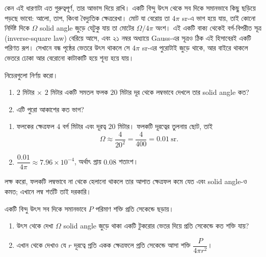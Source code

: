 \documentclass[11pt]{article}
\begin{document}
\begin{remark}
কেন এই ধারণাটা এত গুরুত্বপূর্ণ, তার আভাস দিয়ে রাখি। একটি বিন্দু উৎস থেকে সব
দিকে সমানভাবে কিছু ছড়িয়ে পড়ছে ভাবো: আলো, তাপ, কিংবা বৈদ্যুতিক ক্ষেত্ররেখা।
মোট যা বেরোয় তা $4\pi$ sr-এ ভাগ হয়ে যায়, তাই কোনো নির্দিষ্ট দিকে $\Omega$
solid angle জুড়ে যেটুকু যায় তা মোটের $\Omega/4\pi$ অংশ। এই একটি বাক্য থেকেই
বর্গ-বিপরীত সূত্র (inverse-square law) বেরিয়ে আসে, এবং ২১ নম্বর অধ্যায়ে
Gauss-এর সূত্রও ঠিক এই হিসাবেরই একটি পরিণত রূপ। সেখানে বন্ধ পৃষ্ঠের ভেতরে উৎস
থাকলে সে $4\pi$ sr-এর পুরোটাই জুড়ে থাকে, আর বাইরে থাকলে ভেতরে ঢোকা আর বেরোনো
কাটাকাটি হয়ে শূন্য হয়ে যায়।
\end{remark}

 নিচেরগুলো নির্ণয় করো।
\begin{enumerate}
  \item $2$ মিটার $\times$ $2$ মিটার একটি সমতল ফলক $20$ মিটার দূর থেকে লম্বভাবে
        দেখলে তার solid angle কত?
  \item এটি পুরো আকাশের কত ভাগ?
\end{enumerate}

\begin{sol}
\begin{enumerate}
  \item ফলকের ক্ষেত্রফল $4$ বর্গ মিটার এবং দূরত্ব $20$ মিটার। ফলকটি দূরত্বের
        তুলনায় ছোট, তাই
        \[
          \Omega \approx \frac{4}{20^{2}} = \frac{4}{400} = 0.01 \ \mathrm{sr}.
        \]
  \item $\dfrac{0.01}{4\pi} \approx 7.96 \times 10^{-4}$, অর্থাৎ প্রায়
        $0.08$ শতাংশ।
\end{enumerate}
লক্ষ করো, ফলকটি লম্বভাবে না থেকে হেলানো থাকলে তার আপাত ক্ষেত্রফল কমে যেত এবং
solid angle-ও কমত; এখানে লম্ব শর্তটি তাই দরকারি।
\end{sol}

 একটি বিন্দু উৎস সব দিকে সমানভাবে $P$ পরিমাণ শক্তি প্রতি সেকেন্ডে ছড়ায়।
\begin{enumerate}
  \item উৎস থেকে দেখা $\Omega$ solid angle জুড়ে থাকা একটি টুকরোর ভেতর দিয়ে
        প্রতি সেকেন্ডে কত শক্তি যায়?
  \item এখান থেকে দেখাও যে $r$ দূরত্বে প্রতি একক ক্ষেত্রফলে প্রতি সেকেন্ডে আসা
        শক্তি $\dfrac{P}{4\pi r^{2}}$।
\end{enumerate}
\end{document}
